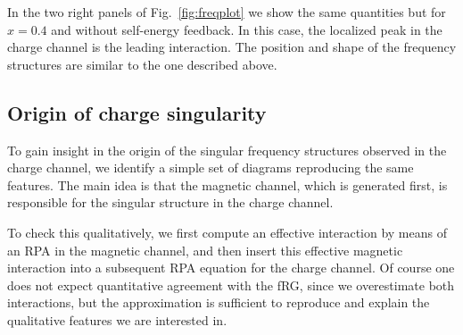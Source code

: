 In the two right panels of Fig.~\ref{fig:freqplot} we show the same quantities but for $x=0.4$ and without self-energy feedback. In this case, the localized peak in the charge channel is the leading interaction. The position and shape of the frequency structures are similar to the one described above.

\subsection{Origin of charge singularity} 

To gain insight in the origin of the singular frequency structures observed in the charge channel, we identify a simple set of diagrams reproducing the same features.   
The main idea is that the magnetic channel, which is generated first, is responsible for the singular structure in the charge channel. 

To check this qualitatively, we first compute an effective interaction by means of an RPA in the magnetic channel, and then insert this effective magnetic interaction into a subsequent RPA equation for the charge channel. 
Of course one does not expect quantitative agreement with the fRG, since we overestimate both interactions, but the approximation is sufficient to reproduce and explain the qualitative features we are interested in.  
  
